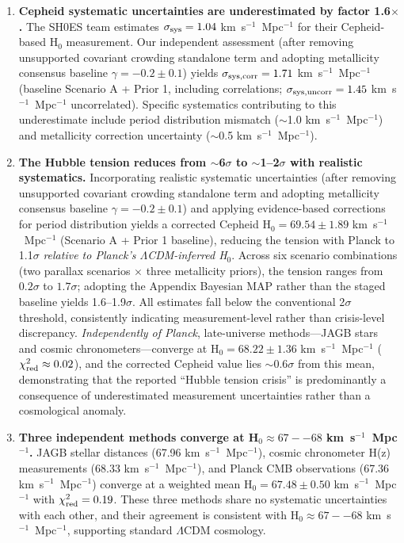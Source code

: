 \documentclass[preprint, linenumbers]{aastex701}
\begin{document}
\begin{enumerate}

\item \textbf{Cepheid systematic uncertainties are underestimated by factor 1.6$\times$.} The SH0ES team estimates $\sigma_{\rm sys} = 1.04$ km~s$^{-1}$~Mpc$^{-1}$ for their Cepheid-based H$_0$ measurement. Our independent assessment (after removing unsupported covariant crowding standalone term and adopting metallicity consensus baseline $\gamma=-0.2\pm0.1$) yields $\sigma_{\rm sys,corr} = 1.71$ km~s$^{-1}$~Mpc$^{-1}$ (baseline Scenario A + Prior 1, including correlations; $\sigma_{\rm sys,uncorr} = 1.45$ km~s$^{-1}$~Mpc$^{-1}$ uncorrelated). Specific systematics contributing to this underestimate include period distribution mismatch ($\sim$1.0 km~s$^{-1}$~Mpc$^{-1}$) and metallicity correction uncertainty ($\sim$0.5 km~s$^{-1}$~Mpc$^{-1}$).

\item \textbf{The Hubble tension reduces from $\sim$6$\sigma$ to $\sim$1--2$\sigma$ with realistic systematics.} Incorporating realistic systematic uncertainties (after removing unsupported covariant crowding standalone term and adopting metallicity consensus baseline $\gamma=-0.2\pm0.1$) and applying evidence-based corrections for period distribution yields a corrected Cepheid H$_0 = 69.54 \pm 1.89$ km~s$^{-1}$~Mpc$^{-1}$ (Scenario A + Prior 1 baseline), reducing the tension with Planck to 1.1$\sigma$ \textit{relative to Planck's $\Lambda$CDM-inferred H$_0$}. Across six scenario combinations (two parallax scenarios $\times$ three metallicity priors), the tension ranges from $0.2\sigma$ to $1.7\sigma$; adopting the Appendix Bayesian MAP rather than the staged baseline yields 1.6--1.9$\sigma$. All estimates fall below the conventional 2$\sigma$ threshold, consistently indicating measurement-level rather than crisis-level discrepancy. \textit{Independently of Planck}, late-universe methods---JAGB stars and cosmic chronometers---converge at H$_0 = 68.22 \pm 1.36$ km~s$^{-1}$~Mpc$^{-1}$ ($\chi^2_{\rm red} \approx 0.02$), and the corrected Cepheid value lies $\sim$0.6$\sigma$ from this mean, demonstrating that the reported ``Hubble tension crisis'' is predominantly a consequence of underestimated measurement uncertainties rather than a cosmological anomaly.

\item \textbf{Three independent methods converge at H$_0 \approx 67--68$ km~s$^{-1}$~Mpc$^{-1}$.} JAGB stellar distances (67.96 km~s$^{-1}$~Mpc$^{-1}$), cosmic chronometer H(z) measurements (68.33 km~s$^{-1}$~Mpc$^{-1}$), and Planck CMB observations (67.36 km~s$^{-1}$~Mpc$^{-1}$) converge at a weighted mean H$_0 = 67.48 \pm 0.50$ km~s$^{-1}$~Mpc$^{-1}$ with $\chi^2_{\rm red} = 0.19$. These three methods share no systematic uncertainties with each other, and their agreement is consistent with H$_0 \approx 67--68$ km~s$^{-1}$~Mpc$^{-1}$, supporting standard $\Lambda$CDM cosmology.


\end{enumerate}
\end{document}
